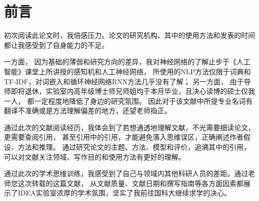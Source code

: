 \section*{前言}

初次阅读此论文时，我倍感压力。论文的研究机构、其中的使用方法和发表的时间都让我感受到了自身能力的不足。

一方面，
因为基础的薄弱和研究方向的差异，我对神经网络的了解止步于《人工智能》课堂上所讲授的感知机和人工神经网络，
所使用的NLP方法仅限于词典和TF-IDF，对词嵌入和循环神经网络RNN方法几乎没有了解；
另一方面，
由于导师即将退休，实验室内高年级博士师兄师姐均于本月毕业，且决心读博的硕士仅我一人，
都一定程度地降低了身边的研究氛围。
因此对于该文献中所提专业名词有翻译不准确或是方法理解偏差的地方，还望老师指正。

通过此次的文献阅读经历，我体会到了若想通透地理解文献，不光需要细读论文，更需要查阅引用，
甚至引用中的引用，才能避免落入思维误区，正确阐述作者假设、方法和推理。
通过研究论文的主题、方法、模型和评价，追溯其中的引用，可以对文献关注领域、写作目的和使用方法有更好的理解。

通过此次的学术思维训练，我感受到了自己与领域内其他科研人员的差距。通过老师您这次转载的这篇文献，
从文献质量、文献日期和撰写指南等各方面因素都展示了IDEA实验室浓厚的学术氛围，坚实了我前往国科大继续求学的决心。




